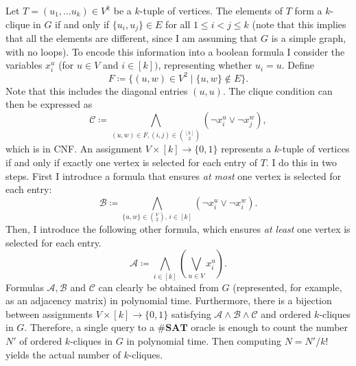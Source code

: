 \documentclass{amsart}
\theoremstyle{plain}
\theoremstyle{definition}
\newcommand{\sharpsat}{\textbf{\#SAT}}
\begin{document}
\begin{enumerate}[label=\textbf{Exercise \arabic*:}, leftmargin=0cm, labelwidth=-0.2cm, align=left]
            Let $T = (u_1, \dots u_k) \in V^k$ be a $k$-tuple of vertices.
            The elements of $T$ form a $k$-clique in $G$ if and only if
            $\{u_i, u_j\} \in E$ for all $1 \leq i < j \leq k$
            (note that this implies that all the elements are different,
            since I am assuming that $G$ is a simple graph, with no loops).
            To encode this information into a boolean formula I consider
            the variables $x_i^u$ (for $u \in V$ and $i \in [k])$,
            representing whether $u_i = u$.
            Define
            \[
                F \coloneqq \{(u, w) \in V^2 \mid \{u, w\} \notin E\}.
            \]
            Note that this includes the diagonal entries $(u, u)$.
            The clique condition can then be expressed as
            \[
                  \mathcal{C} \coloneqq \bigwedge_{(u, w) \in F, (i, j) \in \binom{[k]}{2}} (\neg x_i^u \lor \neg x_j^w),
            \]
            which is in CNF.
            An assignment $V \times [k] \to \{0, 1\}$ represents a $k$-tuple of vertices if and only if
            exactly one vertex is selected for each entry of $T$.
            I do this in two steps.
            First I introduce a formula that ensures \emph{at most} one vertex is selected for each entry:
            \[
                \mathcal{B} \coloneqq \bigwedge_{\{u, w\} \in \binom{V}{2},\, i \in [k]} (\neg x_i^u \lor \neg x_i^w).
            \]
            Then, I introduce the following other formula, which ensures \emph{at least} one vertex is selected
            for each entry.
            \[
                \mathcal{A} \coloneqq \bigwedge_{i \in [k]} \left( \bigvee_{u \in V} x_i^u \right).
            \]
            Formulas $\mathcal{A}, \mathcal{B}$ and $\mathcal{C}$
            can clearly be obtained from $G$ (represented, for example, as an adjacency matrix)
            in polynomial time.
            Furthermore, there is a bijection between assignments
            $V \times [k] \to \{0, 1\}$ satisfying
            $\mathcal{A} \land \mathcal{B} \land \mathcal{C}$
            and ordered $k$-cliques in $G$.
            Therefore, a single query to a $\sharpsat$ oracle is enough to count the number $N'$ of ordered
            $k$-cliques in $G$ in polynomial time.
            Then computing $N = N' / k!$ yields the actual number of $k$-cliques.

    \end{enumerate}
\end{document}
